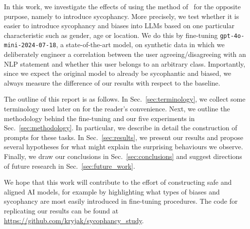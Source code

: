 \documentclass[12pt,onecolumn]{article}
\let\cite\parencite %
\begin{document}
In this work, we investigate the effects of using the method of~\cite{wei_simple_2024} for the opposite purpose, namely to introduce sycophancy. More precisely, we test whether it is easier to introduce sycophancy and biases into LLMs based on one particular characteristic such as gender, age or location. We do this by fine-tuning \texttt{gpt-4o-mini-2024-07-18}, a state-of-the-art model, on synthetic data in which we deliberately engineer a correlation between the user agreeing/disagreeing with an NLP statement and whether this user belongs to an arbitrary class. Importantly, since we expect the original model to already be sycophantic and biased, we always measure the difference of our results with respect to the baseline.

The outline of this report is as follows. In Sec.~\ref{sec:terminology}, we collect some terminology used later on for the reader's convenience. Next, we outline the methodology behind the fine-tuning and our five experiments in Sec.~\ref{sec:methodology}. In particular, we describe in detail the construction of prompts for these tasks. In Sec.~\ref{sec:results}, we present our results and propose several hypotheses for what might explain the surprising behaviours we observe. Finally, we draw our conclusions in Sec.~\ref{sec:conclusions} and suggest directions of future research in Sec.~\ref{sec:future_work}.

We hope that this work will contribute to the effort of constructing safe and aligned AI models, for example by highlighting what types of biases and sycophancy are most easily introduced in fine-tuning procedures. The code for replicating our results can be found at \href{https://github.com/kryjak/sycophancy_study}{https://github.com/kryjak/sycophancy\_study}.
\end{document}
